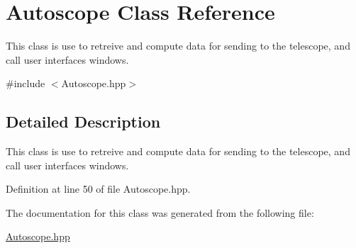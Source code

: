 \hypertarget{class_autoscope}{}\section{Autoscope Class Reference}
\label{class_autoscope}


This class is use to retreive and compute data for sending to the telescope, and call user interfaces windows.  




{\ttfamily \#include $<$Autoscope.\+hpp$>$}



\subsection{Detailed Description}
This class is use to retreive and compute data for sending to the telescope, and call user interfaces windows. 

Definition at line 50 of file Autoscope.\+hpp.



The documentation for this class was generated from the following file\+:\begin{DoxyCompactItemize}
\item 
\mbox{\hyperlink{_autoscope_8hpp}{Autoscope.\+hpp}}\end{DoxyCompactItemize}
